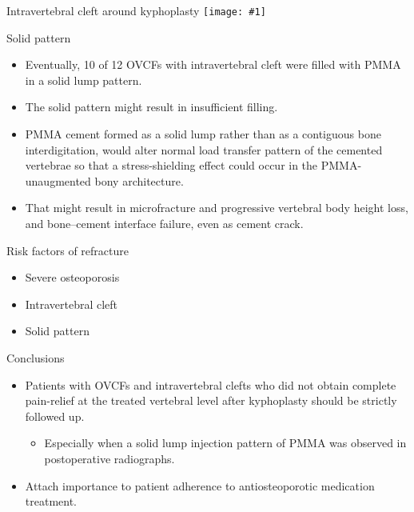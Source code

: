 \documentclass{beamer}
\newcommand*{\solo}[1]{\centering\texttt{[image: \#1]}}
\begin{document}
\begin{frame}{Intravertebral cleft around kyphoplasty}
    \solo{F4.jpg}
\end{frame}

\begin{frame}{Solid pattern}
    \begin{itemize}
        \item Eventually, 10 of 12 OVCFs with intravertebral cleft were filled
              with PMMA in a solid lump pattern.
        \item The solid pattern might result in insufficient filling.
        \item PMMA cement formed as a solid lump rather than as a contiguous
              bone interdigitation, would alter normal load transfer pattern of
              the cemented vertebrae so that a stress-shielding effect could
              occur in the PMMA-unaugmented bony architecture.
        \item That might result in microfracture and progressive vertebral body
              height loss, and bone--cement interface failure, even as cement
              crack.
    \end{itemize}
\end{frame}

\begin{frame}{Risk factors of refracture}
    \begin{itemize}
        \item Severe osteoporosis
        \item Intravertebral cleft 
        \item Solid pattern
    \end{itemize}
\end{frame}

\begin{frame}{Conclusions}
    \begin{itemize}
        \item Patients with OVCFs and intravertebral clefts who did not obtain
              complete pain-relief at the treated vertebral level after
              kyphoplasty should be strictly followed up.
            \begin{itemize}
                \item Especially when a solid lump injection pattern of PMMA
                      was observed in postoperative radiographs.
            \end{itemize}
        \item Attach importance to patient adherence to antiosteoporotic
              medication treatment.
    \end{itemize}
\end{frame}
\end{document}
